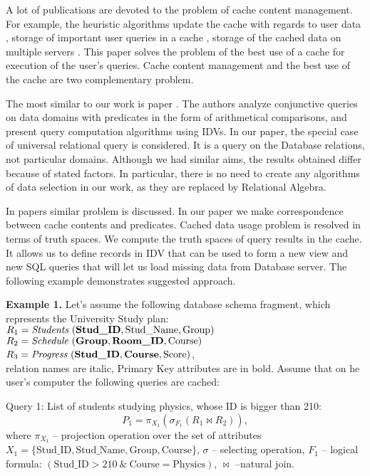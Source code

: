 \documentclass[prodmode,acmtods]{acmsmall} %
\begin{document}
A lot of publications are devoted to the problem of cache content management.
For example, the heuristic algorithms update the cache with regards to user data
\cite{chang}, storage of important user queries in a cache
\cite{baralis}, storage of the cached data on multiple servers \cite{kalnis}.
This paper solves the problem of the best use of a cache for execution of the
user's queries. Cache content management and the best use of the cache are two
complementary problem.

The most similar to our work is paper \cite{Afrati06}. The authors analyze
conjunctive queries on data domains with predicates in the form of arithmetical
comparisons, and present query computation algorithms using IDVs. In our paper,
the special case of universal relational query is considered. It is a query on
the Database relations, not particular domains. Although we had similar aims,
the results obtained differ because of stated factors. In particular, there is
no need to create any algorithms of data selection in our work, as they are
replaced by Relational Algebra.

In papers \cite{Keller96, shim} similar problem is discussed. In our paper we
make correspondence between cache contents and predicates. Cached data usage
problem is resolved in terms of truth spaces. We compute the truth spaces of
query results in the cache. It allows us to define records in IDV that can be
used to form a new view and new SQL queries that will let us load missing data
from Database server. The following example demonstrates suggested approach.

{\bf Example 1.} Let's assume the following database schema fragment, which
represents the University Study plan:\\
$R_1 =\mbox{\it Students}\ (\mbox{\bf Stud\_ID}, \mbox{Stud\_Name},
\mbox{Group})$\\
$R_2 =\mbox{\it Schedule}\ (\mbox{\bf Group}, \mbox{\bf Room\_ID},
\mbox{Course})$\\
$R_3 =\mbox{\it Progress}\ (\mbox{\bf Stud\_ID}, \mbox{\bf Course},
\mbox{Score})$,\\
relation names are italic, Primary Key attributes are in bold. Assume that on 
he user's computer the following queries are cached:

Query 1: List of students studying physics, whose ID is bigger than 210:
$$P_1 = \pi_{X_1}(\sigma_{F_1} (R_1 \Join R_2)),$$
where $\pi_{X_1}$ -- projection operation over the set of attributes
$X_1 = \{\text{Stud\_ID}, \text{Stud\_Name}, \text{Group}, \text{Course}\}$,
$\sigma$ -- selecting operation,
$F_1$ -- logical formula: $(\text{Stud\_ID} > 210\ \&\ \text{Course} =
\text{Physics})$, $\Join$ --natural join.
\end{document}
